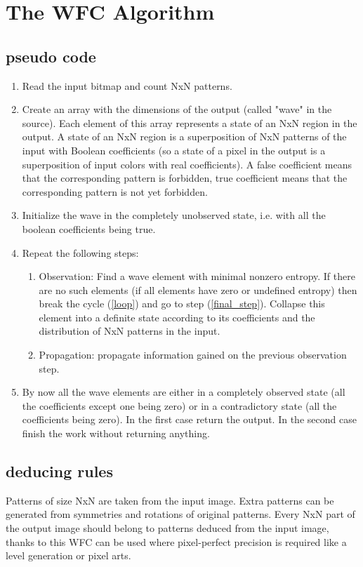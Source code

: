 \documentclass[shortabstract, english, inz]{iithesis}
\begin{document}
\chapter{The WFC Algorithm}
\label{chapter3}
\section{pseudo code}
\begin{enumerate}
    \item Read the input bitmap and count NxN patterns.
    \item Create an array with the dimensions of the output (called "wave" in the source). Each element of this array represents a state of an NxN region in the output. A state of an NxN region is a superposition of NxN patterns of the input with Boolean coefficients (so a state of a pixel in the output is a superposition of input colors with real coefficients). A false coefficient means that the corresponding pattern is forbidden, true coefficient means that the corresponding pattern is not yet forbidden.
    \item Initialize the wave in the completely unobserved state, i.e. with all the boolean coefficients being true.
    \item \label{loop}Repeat the following steps:
    \begin{enumerate}
        \item Observation:
Find a wave element with minimal nonzero entropy. If there are no such elements (if all elements have zero or undefined entropy) then break the cycle (\ref{loop}) and go to step (\ref{final_step}).
Collapse this element into a definite state according to its coefficients and the distribution of NxN patterns in the input.
        \item Propagation: propagate information gained on the previous observation step.
    \end{enumerate}
    \item \label{final_step}By now all the wave elements are either in a completely observed state (all the coefficients except one being zero) or in a contradictory state (all the coefficients being zero). In the first case return the output. In the second case finish the work without returning anything.
\end{enumerate}
\cite{MaximGumin}

\section{deducing rules}
Patterns of size NxN are taken from the input image. Extra patterns can be generated from symmetries and rotations of original patterns. Every NxN part of the output image should belong to patterns deduced from the input image, thanks to this WFC can be used where pixel-perfect precision is required like a level generation or pixel arts.\cite{MaximGumin}
\end{document}
